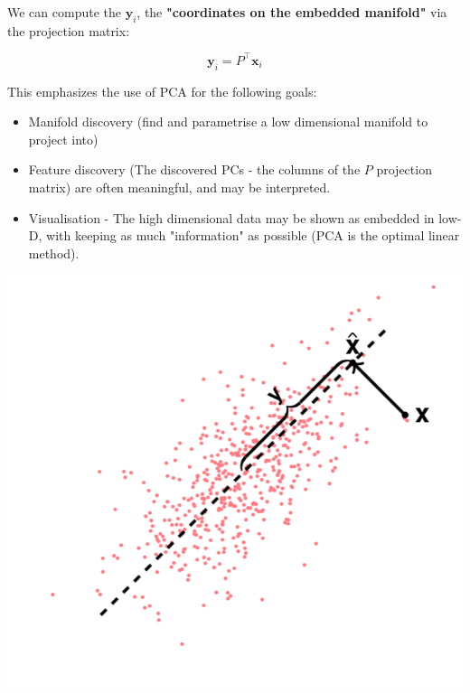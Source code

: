\documentclass[11pt]{article}
\begin{document}
  \clearpage

\begin{tcolorbox}[title=PCA uses \#1]

 We can compute the $\mathbf{y}_i$, the \textbf{"coordinates on the embedded manifold"} via the projection matrix:
 
$$\mathbf{y}_i = P^\top \mathbf{x}_i$$

This emphasizes the use of PCA for the following goals:

\begin{itemize}
	\item Manifold discovery (find and parametrise a low dimensional manifold to project into)
	\item Feature discovery (The discovered PCs - the columns of the $P$ projection matrix) are often meaningful, and may be interpreted.
	\item Visualisation - The high dimensional data may be shown as embedded in low-D, with keeping as much "information" as possible (PCA is the optimal linear method).
\end{itemize}

\begin{center}
\includegraphics[width=0.75\linewidth]{dimred_pca_project}	
\end{center}


\end{tcolorbox}

\clearpage


\vspace{1cm}
\end{document}

